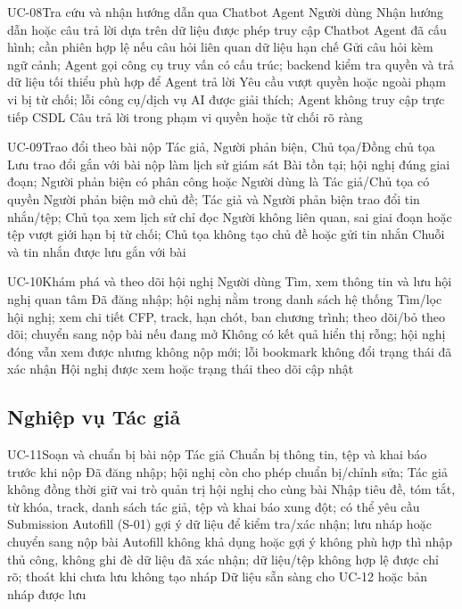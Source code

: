 \UseCaseSpec
{UC-08}{Tra cứu và nhận hướng dẫn qua Chatbot Agent}
{Người dùng}
{Nhận hướng dẫn hoặc câu trả lời dựa trên dữ liệu được phép truy cập}
{Chatbot Agent đã cấu hình; cần phiên hợp lệ nếu câu hỏi liên quan dữ liệu hạn chế}
{Gửi câu hỏi kèm ngữ cảnh; Agent gọi công cụ truy vấn có cấu trúc; backend kiểm tra quyền và trả dữ liệu tối thiểu phù hợp để Agent trả lời}
{Yêu cầu vượt quyền hoặc ngoài phạm vi bị từ chối; lỗi công cụ/dịch vụ AI được giải thích; Agent không truy cập trực tiếp CSDL}
{Câu trả lời trong phạm vi quyền hoặc từ chối rõ ràng}

\UseCaseSpec
{UC-09}{Trao đổi theo bài nộp}
{Tác giả, Người phản biện, Chủ tọa/Đồng chủ tọa}
{Lưu trao đổi gắn với bài nộp làm lịch sử giám sát}
{Bài tồn tại; hội nghị đúng giai đoạn; Người phản biện có phân công hoặc Người dùng là Tác giả/Chủ tọa có quyền}
{Người phản biện mở chủ đề; Tác giả và Người phản biện trao đổi tin nhắn/tệp; Chủ tọa xem lịch sử chỉ đọc}
{Người không liên quan, sai giai đoạn hoặc tệp vượt giới hạn bị từ chối; Chủ tọa không tạo chủ đề hoặc gửi tin nhắn}
{Chuỗi và tin nhắn được lưu gắn với bài}

\UseCaseSpec
{UC-10}{Khám phá và theo dõi hội nghị}
{Người dùng}
{Tìm, xem thông tin và lưu hội nghị quan tâm}
{Đã đăng nhập; hội nghị nằm trong danh sách hệ thống}
{Tìm/lọc hội nghị; xem chi tiết CFP, track, hạn chót, ban chương trình; theo dõi/bỏ theo dõi; chuyển sang nộp bài nếu đang mở}
{Không có kết quả hiển thị rỗng; hội nghị đóng vẫn xem được nhưng không nộp mới; lỗi bookmark không đổi trạng thái đã xác nhận}
{Hội nghị được xem hoặc trạng thái theo dõi cập nhật}


\subsection{Nghiệp vụ Tác giả}

\UseCaseSpec
{UC-11}{Soạn và chuẩn bị bài nộp}
{Tác giả}
{Chuẩn bị thông tin, tệp và khai báo trước khi nộp}
{Đã đăng nhập; hội nghị còn cho phép chuẩn bị/chỉnh sửa; Tác giả không đồng thời giữ vai trò quản trị hội nghị cho cùng bài}
{Nhập tiêu đề, tóm tắt, từ khóa, track, danh sách tác giả, tệp và khai báo xung đột; có thể yêu cầu Submission Autofill (S-01) gợi ý dữ liệu để kiểm tra/xác nhận; lưu nháp hoặc chuyển sang nộp bài}
{Autofill không khả dụng hoặc gợi ý không phù hợp thì nhập thủ công, không ghi đè dữ liệu đã xác nhận; dữ liệu/tệp không hợp lệ được chỉ rõ; thoát khi chưa lưu không tạo nháp}
{Dữ liệu sẵn sàng cho UC-12 hoặc bản nháp được lưu}

